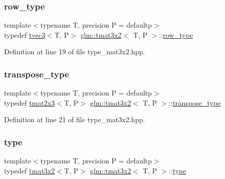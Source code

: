 \subsubsection{\texorpdfstring{row\_type}{row\_type}}
{\footnotesize\ttfamily template$<$typename T, precision P = defaultp$>$ \\
typedef \mbox{\hyperlink{structglm_1_1tvec3}{tvec3}}$<$T, P$>$ \mbox{\hyperlink{structglm_1_1tmat3x2}{glm\+::tmat3x2}}$<$ T, P $>$\+::\mbox{\hyperlink{structglm_1_1tmat3x2_a54b0650d908b47bb1410661d9b049d90}{row\+\_\+type}}}



Definition at line 19 of file type\+\_\+mat3x2.\+hpp.

\mbox{\label{structglm_1_1tmat3x2_a2ab17a834a083c22dae03db5057bc235}} 
\subsubsection{\texorpdfstring{transpose\_type}{transpose\_type}}
{\footnotesize\ttfamily template$<$typename T, precision P = defaultp$>$ \\
typedef \mbox{\hyperlink{structglm_1_1tmat2x3}{tmat2x3}}$<$T, P$>$ \mbox{\hyperlink{structglm_1_1tmat3x2}{glm\+::tmat3x2}}$<$ T, P $>$\+::\mbox{\hyperlink{structglm_1_1tmat3x2_a2ab17a834a083c22dae03db5057bc235}{transpose\+\_\+type}}}



Definition at line 21 of file type\+\_\+mat3x2.\+hpp.

\mbox{\label{structglm_1_1tmat3x2_a170987a0b4f9663c8beeaca40042e0c8}} 
\subsubsection{\texorpdfstring{type}{type}}
{\footnotesize\ttfamily template$<$typename T, precision P = defaultp$>$ \\
typedef \mbox{\hyperlink{structglm_1_1tmat3x2}{tmat3x2}}$<$T, P$>$ \mbox{\hyperlink{structglm_1_1tmat3x2}{glm\+::tmat3x2}}$<$ T, P $>$\+::\mbox{\hyperlink{structglm_1_1tmat3x2_a170987a0b4f9663c8beeaca40042e0c8}{type}}}



